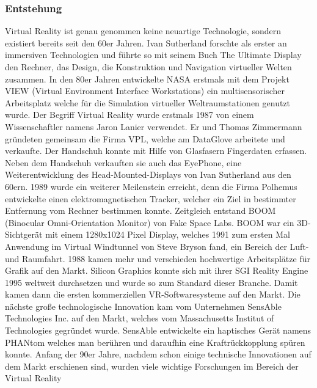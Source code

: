 \documentclass[a4paper,12pt,oneside]{article}
\begin{document}
      \subsubsection{Entstehung}
        Virtual Reality ist genau genommen keine neuartige Technologie, sondern existiert
        bereits seit den 60er Jahren. Ivan Sutherland forschte als erster an immersiven 
        Technologien und führte so mit seinem Buch \glqq The Ultimate Display\grqq{} 
        den Rechner, das Design, die Konstruktion und Navigation virtueller Welten zusammen.
        In den 80er Jahren entwickelte NASA erstmals mit dem Projekt VIEW (Virtual 
        Environment Interface Workstations) ein multisensorischer Arbeitsplatz welche für 
        die Simulation virtueller Weltraumstationen genutzt wurde.
        Der Begriff Virtual Reality wurde erstmals 1987 von einem Wissenschaftler namens Jaron
        Lanier verwendet. Er und Thomas Zimmermann gründeten gemeinsam die Firma VPL, welche
        am \glqq DataGlove\grqq{} arbeitete und verkaufte. Der Handschuh konnte mit Hilfe
        von Glasfasern Fingerdaten erfassen. Neben dem Handschuh verkauften sie auch das 
        \glqq EyePhone\grqq{}, eine Weiterentwicklung des Head-Mounted-Displays von Ivan
        Sutherland aus den 60ern.
        1989 wurde ein weiterer Meilenstein erreicht, denn die Firma Polhemus entwickelte 
        einen elektromagnetischen Tracker, welcher ein Ziel in bestimmter Entfernung vom 
        Rechner bestimmen konnte. 
        Zeitgleich entstand BOOM (Binocular Omni-Orientation Monitor) von Fake Space Labs.
        BOOM war ein 3D-Sichtgerät mit einem 1280x1024 Pixel Display, welches 1991 zum 
        ersten Mal Anwendung im \glqq Virtual Windtunnel\grqq{} von Steve Bryson fand, 
        ein Bereich der Luft- und Raumfahrt.
        1988 kamen mehr und verschieden hochwertige Arbeitsplätze für Grafik auf den Markt.
        Silicon Graphics konnte sich mit ihrer SGI Reality Engine 1995 weltweit durchsetzen
        und wurde so zum Standard dieser Branche. Damit kamen dann die ersten kommerziellen
        VR-Softwaresysteme auf den Markt.
        Die nächste große technologische Innovation kam vom Unternehmen SensAble
        Technologies Inc. auf den Markt, welches vom Massachusetts Institut of Technologies
        gegründet wurde. SensAble entwickelte ein haptisches Gerät namens 
        \glqq PHANtom\grqq{} welches man berühren und daraufhin eine
        Kraftrückkopplung spüren konnte.
        Anfang der 90er Jahre, nachdem schon einige technische Innovationen auf dem Markt
        erschienen sind, wurden viele wichtige Forschungen im Bereich der Virtual Reality
\end{document}
